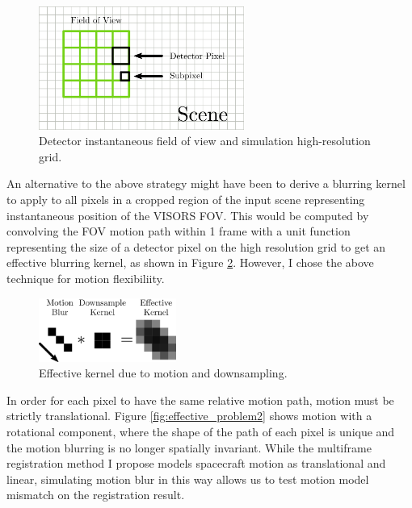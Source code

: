 \documentclass[tocnosub,noragright,centerchapter,12pt]{uiucecethesis09}
\begin{document}
\begin{figure}
  \centering
  \includegraphics[width=0.6\textwidth]{figures/frame_subpixel.png}
  \caption{Detector instantaneous field of view and simulation high-resolution grid.}
  \label{fig:frame_integration}
\end{figure}

An alternative to the above strategy might have been to derive a blurring kernel to apply to all pixels in a cropped region of the input scene representing instantaneous position of the VISORS FOV.  This would be computed by convolving the FOV motion path within 1 frame with a unit function representing the size of a detector pixel on the high resolution grid to get an effective blurring kernel, as shown in Figure \ref{fig:effective_kernel}.  However, I chose the above technique for motion flexibiliity.

\begin{figure}
  \centering
  \includegraphics[width=0.4\textwidth]{figures/effective_kernel.png}
  \caption{Effective kernel due to motion and downsampling.}
  \label{fig:effective_kernel}
\end{figure}


In order for each pixel to have the same relative motion path, motion must be strictly translational.  Figure \ref{fig:effective_problem2} shows motion with a rotational component, where the shape of the path of each pixel is unique and the motion blurring is no longer spatially invariant.  While the multiframe registration method I propose models spacecraft motion as translational and linear, simulating motion blur in this way allows us to test motion model mismatch on the registration result.
\end{document}
